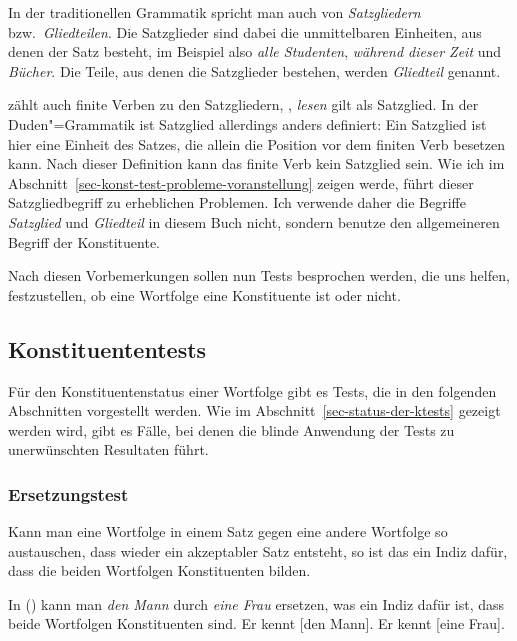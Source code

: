 \documentclass[ number=45
			   ,series=eotms
			   ,printondemand
			  ]{langsci}
\newcommand{\page}{S.\,}
\begin{document}
{In der traditionellen Grammatik spricht man auch von \emph{Satzgliedern} bzw.\
\emph{Gliedteilen}. Die Satzglieder sind dabei die unmittelbaren Einheiten, aus denen
der Satz besteht, im Beispiel also \emph{alle Studenten}, \emph{während dieser Zeit} und
\emph{Bücher}. Die Teile, aus denen die Satzglieder bestehen, werden \emph{Gliedteil} genannt.

\citet{Bussmann2002a} zählt auch finite Verben zu den Satzgliedern, \dash, \emph{lesen} gilt als
Satzglied. In der Duden"=Grammatik \citeyearpar[\page 783]{Duden2005} ist Satzglied
allerdings anders definiert: Ein Satzglied ist hier eine Einheit des Satzes, die allein die Position vor
dem finiten Verb besetzen kann. Nach dieser Definition kann das finite Verb kein Satzglied sein. Wie
ich im Abschnitt~\ref{sec-konst-test-probleme-voranstellung} zeigen werde, führt dieser Satzgliedbegriff zu erheblichen Problemen. Ich
verwende daher die Begriffe \emph{Satzglied} und \emph{Gliedteil} in diesem Buch nicht, sondern
benutze den allgemeineren Begriff der Konstituente. 

Nach diesen Vorbemerkungen sollen nun Tests besprochen werden, die uns helfen, festzustellen, ob
eine Wortfolge eine Konstituente ist oder nicht.

\subsection{Konstituententests}

Für den Konstituentenstatus einer Wortfolge gibt es Tests, die in den folgenden Abschnitten vorgestellt werden.
Wie im Abschnitt~\ref{sec-status-der-ktests} gezeigt werden wird, gibt es Fälle, bei denen die
blinde Anwendung der Tests zu unerwünschten Resultaten führt.

\subsubsection{Ersetzungstest}

Kann man eine Wortfolge %
in einem Satz gegen eine andere Wortfolge so
austauschen, dass 
wieder ein akzeptabler Satz entsteht, so ist das ein Indiz dafür, dass 
die beiden Wortfolgen Konstituenten bilden.

In () kann man \emph{den Mann} durch \emph{eine Frau} ersetzen, was ein Indiz dafür
ist, dass beide Wortfolgen Konstituenten sind.
\eal
\ex Er kennt [den Mann].
\ex Er kennt [eine Frau].
\zl

}
\end{document}
